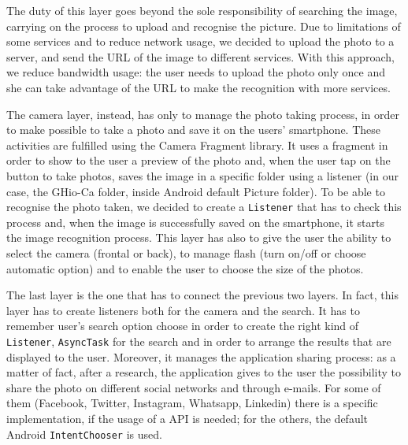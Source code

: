 The duty of this layer goes beyond the sole responsibility of searching the 
image, carrying on the process to upload and recognise the picture.
Due to limitations of some services and to reduce network usage, we decided 
to upload the photo to a server, and send the URL of the image to different 
services.
With this approach, we reduce bandwidth usage: the user needs to upload the
photo only once and she can take advantage of the URL to make the recognition 
with more services.

The camera layer, instead, has only to manage the photo taking process, in order
to make possible to take a photo and save it on the users' smartphone. These
activities are fulfilled using the Camera Fragment library. It uses a fragment
in order to show to the user a preview of the photo and, when the user tap on
the button to take photos, saves the image in a specific folder using a
listener (in our case, the GHio-Ca folder, inside Android default Picture
folder). To be able to recognise the photo taken, we decided to create a
\texttt{Listener} that has to check this process and, when the image is 
successfully saved on the smartphone, it starts the image recognition process.
This layer has also to give the user the ability to select the camera (frontal
or back), to manage flash (turn on/off or choose automatic option) and to enable
the user to choose the size of the photos.

The last layer is the one that has to connect the previous two layers. In fact,
this layer has to create listeners both for the camera and the search. It has
to remember user's search option choose in order to create the right kind of
\texttt{Listener}, \texttt{AsyncTask} for the search and in order to arrange the 
results that are displayed to the user. Moreover, it manages the application
sharing process: as a matter of fact, after a research, the application gives 
to the user the possibility to share the photo on different social networks and
through e-mails. For some of them (Facebook, Twitter, Instagram, Whatsapp,
Linkedin) there is a specific implementation, if the usage of a API is needed;
for the others, the default Android \texttt{IntentChooser} is used.
